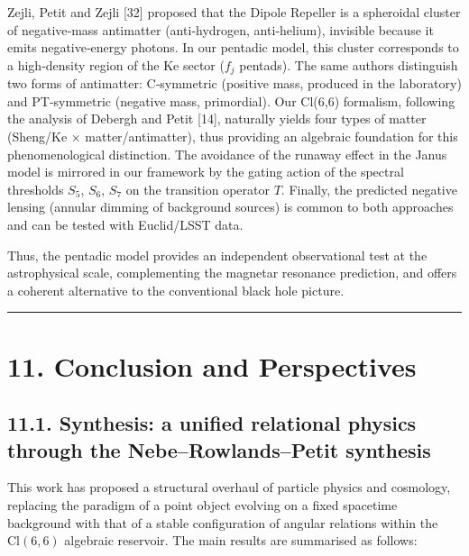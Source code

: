 \documentclass[11pt]{article}
\begin{document}
Zejli, Petit and Zejli {[}32{]} proposed that the Dipole Repeller is a
spheroidal cluster of negative‑mass antimatter (anti‑hydrogen,
anti‑helium), invisible because it emits negative‑energy photons. In our
pentadic model, this cluster corresponds to a high‑density region of the
Ke sector (\(f_j\) pentads). The same authors distinguish two forms of
antimatter: C‑symmetric (positive mass, produced in the laboratory) and
PT‑symmetric (negative mass, primordial). Our Cl(6,6) formalism,
following the analysis of Debergh and Petit {[}14{]}, naturally yields
four types of matter (Sheng/Ke × matter/antimatter), thus providing an
algebraic foundation for this phenomenological distinction. The
avoidance of the runaway effect in the Janus model is mirrored in our
framework by the gating action of the spectral thresholds \(S_5\),
\(S_6\), \(S_7\) on the transition operator \(T\). Finally, the
predicted negative lensing (annular dimming of background sources) is
common to both approaches and can be tested with Euclid/LSST data.

Thus, the pentadic model provides an independent observational test at
the astrophysical scale, complementing the magnetar resonance
prediction, and offers a coherent alternative to the conventional black
hole picture.

\begin{center}\rule{0.5\linewidth}{0.5pt}\end{center}

\hypertarget{conclusion-and-perspectives}{%
\section{11. Conclusion and
Perspectives}\label{conclusion-and-perspectives}}

\hypertarget{synthesis-a-unified-relational-physics-through-the-neberowlandspetit-synthesis}{%
\subsection{11.1. Synthesis: a unified relational physics through the
Nebe--Rowlands--Petit
synthesis}\label{synthesis-a-unified-relational-physics-through-the-neberowlandspetit-synthesis}}

This work has proposed a structural overhaul of particle physics and
cosmology, replacing the paradigm of a point object evolving on a fixed
spacetime background with that of a stable configuration of angular
relations within the \(\text{Cl}(6,6)\) algebraic reservoir. The main
results are summarised as follows:
\end{document}
